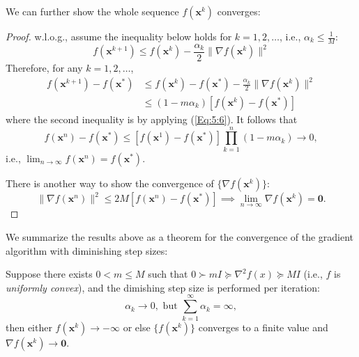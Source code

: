 We can further show the whole sequence $f(\bm x^k)$ converges:
\begin{proof}
w.l.o.g., assume the inequality below holds for $k=1,2,\dots$, i.e., $\alpha_k\le\frac{1}{M}$:
\[
f(\bm x^{k+1}) \le f(\bm x^k) - \frac{\alpha_k}{2}\|\nabla f(\bm x^k)\|^2
\]
Therefore, for any $k=1,2,\dots$,
\begin{align*}
f(\bm x^{k+1}) - f(\bm x^*)&\le f(\bm x^k) - f(\bm x^*)- \frac{\alpha_k}{2}\|\nabla f(\bm x^k)\|^2\\
&\le (1-m\alpha_k)[f(\bm x^k) - f(\bm x^*)]
\end{align*}
where the second inequality is by applying (\ref{Eq:5:6}). It follows that
\[
f(\bm x^n)-f(\bm x^*)\le [f(\bm x^1) - f(\bm x^*)]\prod_{k=1}^n(1-m\alpha_k)\to0,
\]
i.e., $\lim_{n\to\infty}f(\bm x^n) = f(\bm x^*)$.

There is another way to show the convergence of $\{\nabla f(\bm x^k)\}$:
\[
\|\nabla f(\bm x^n)\|^2\le 2M[f(\bm x^n)-f(\bm x^*)]\implies
\lim_{n\to\infty}\nabla f(\bm x^k)=\bm0.
\]
\end{proof}
We summarize the results above as a theorem for the convergence of the gradient algorithm with diminishing step sizes:
\begin{theorem}
Suppose there exists $0< m\le M$ such that
$0\succ mI\succeq \nabla^2f(x)\succeq MI$ (i.e., $f$ is \emph{uniformly convex}), and the dimishing step size is performed per iteration:
\[
\alpha_k\to0,\text{ but }\sum_{k=1}^\infty\alpha_k=\infty,
\]
then either $f(\bm x^k)\to-\infty$ or else $\{f(\bm x^k)\}$ converges to a finite value and $\nabla f(\bm x^k)\to\bm0$.
\end{theorem}

